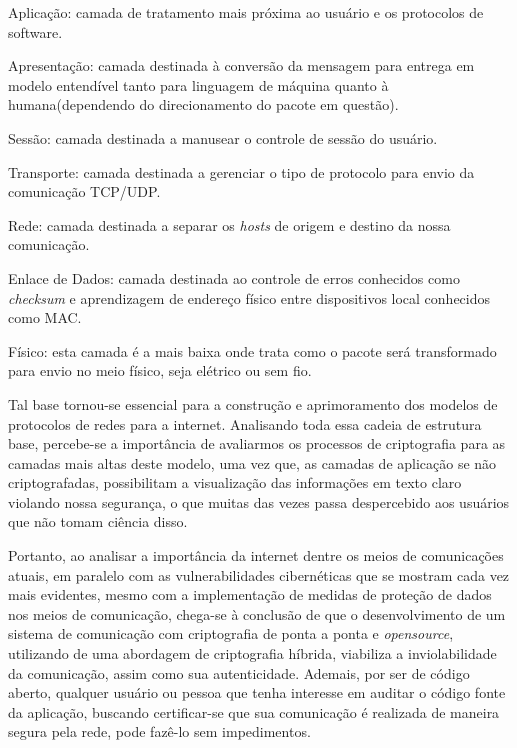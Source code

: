 \begin{etaremune}
  \renewcommand\labelenumi{\bfseries\theenumi.}
\item Aplicação: camada de tratamento mais próxima ao usuário e os
  protocolos de software.
\item Apresentação: camada destinada à conversão da mensagem para
  entrega em modelo entendível tanto para linguagem de máquina quanto
  à humana(dependendo do direcionamento do pacote em questão).
\item Sessão: camada destinada a manusear o controle de sessão do usuário.
\item Transporte: camada destinada a gerenciar o tipo de protocolo
  para envio da comunicação \acs{TCP}/\acs{UDP}.
\item Rede: camada destinada a separar os \textit{hosts} de origem e destino
  da nossa comunicação.
\item Enlace de Dados: camada destinada ao controle de erros
  conhecidos como \textit{\gls{checksum}} e aprendizagem de endereço
  físico entre
  dispositivos local conhecidos como \acs{MAC}.
\item Físico: esta camada é a mais baixa onde trata como o pacote
  será transformado para envio no meio físico, seja elétrico ou sem fio.
\end{etaremune}

Tal base tornou-se essencial para a construção e aprimoramento dos
modelos de protocolos de redes para a internet. Analisando toda essa
cadeia de estrutura base, percebe-se a importância de avaliarmos os
processos de criptografia para as camadas mais altas deste modelo,
uma vez que, as camadas de aplicação se não criptografadas,
possibilitam a visualização das informações em texto claro violando
nossa segurança, o que muitas das vezes passa despercebido aos
usuários que não tomam ciência disso.


Portanto, ao analisar a importância da internet dentre os meios de
comunicações atuais, em paralelo com as vulnerabilidades cibernéticas
que se mostram cada vez mais evidentes, mesmo com a implementação de
medidas de proteção de dados nos meios de comunicação, chega-se à
conclusão de que o desenvolvimento de um sistema de comunicação com
criptografia de ponta a ponta e \textit{\gls{opensource}}, utilizando de uma
abordagem de criptografia híbrida, viabiliza a inviolabilidade da
comunicação, assim como sua autenticidade. Ademais, por ser de código
aberto, qualquer usuário ou pessoa que tenha interesse em auditar o
código fonte da aplicação, buscando certificar-se que sua comunicação
é realizada de maneira segura pela rede, pode fazê-lo sem impedimentos.

